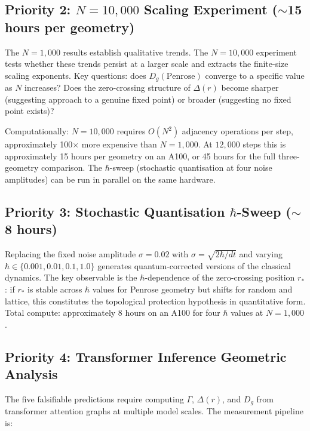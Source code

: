 \documentclass[11pt,a4paper]{article}
\begin{document}
\subsection{Priority 2: $N = 10{,}000$ Scaling Experiment ($\sim$15 hours per geometry)}

The $N = 1{,}000$ results establish qualitative trends. The $N = 10{,}000$ experiment tests whether these trends persist at a larger scale and extracts the finite-size scaling exponents. Key questions: does $D_g(\text{Penrose})$ converge to a specific value as $N$ increases? Does the zero-crossing structure of $\Delta(r)$ become sharper (suggesting approach to a genuine fixed point) or broader (suggesting no fixed point exists)?

Computationally: $N = 10{,}000$ requires $O(N^2)$ adjacency operations per step, approximately 100$\times$ more expensive than $N = 1{,}000$. At $12{,}000$ steps this is approximately 15 hours per geometry on an A100, or 45 hours for the full three-geometry comparison. The $\hbar$-sweep (stochastic quantisation at four noise amplitudes) can be run in parallel on the same hardware.

\subsection{Priority 3: Stochastic Quantisation $\hbar$-Sweep ($\sim$8 hours)}

Replacing the fixed noise amplitude $\sigma = 0.02$ with $\sigma = \sqrt{2\hbar/dt}$ and varying $\hbar \in \{0.001, 0.01, 0.1, 1.0\}$ generates quantum-corrected versions of the classical dynamics. The key observable is the $\hbar$-dependence of the zero-crossing position $r_*$: if $r_*$ is stable across $\hbar$ values for Penrose geometry but shifts for random and lattice, this constitutes the topological protection hypothesis in quantitative form. Total compute: approximately 8 hours on an A100 for four $\hbar$ values at $N = 1{,}000$.

\subsection{Priority 4: Transformer Inference Geometric Analysis}

The five falsifiable predictions require computing $\Gamma$, $\Delta(r)$, and $D_g$ from transformer attention graphs at multiple model scales. The measurement pipeline is:
\end{document}
